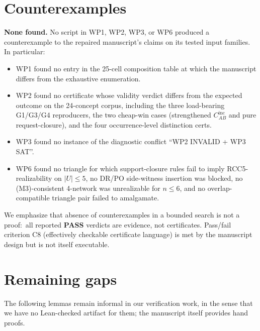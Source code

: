 \documentclass[11pt]{article}
\newcommand{\PASS}{\textcolor{black!70!green}{\textbf{PASS}}}
\begin{document}
\section{Counterexamples}

\textbf{None found.}  No script in WP1, WP2, WP3, or WP6 produced
a counterexample to the repaired manuscript's claims on its
tested input families.  In particular:
\begin{itemize}[leftmargin=2em]
  \item WP1 found no entry in the 25-cell composition table at
    which the manuscript differs from the exhaustive enumeration.
  \item WP2 found no certificate whose validity verdict differs
    from the expected outcome on the 24-concept corpus, including
    the three load-bearing G1/G3/G4 reproducers, the two cheap-win
    cases (strengthened \(C_{AB}^{\mathrm{inc}}\) and pure
    request-closure), and the four occurrence-level distinction
    certs.
  \item WP3 found no instance of the diagnostic conflict ``WP2
    INVALID + WP3 SAT''.
  \item WP6 found no triangle for which support-closure rules
    fail to imply RCC5-realizability on \(|U| \le 5\), no DR/PO
    side-witness insertion was blocked, no (M3)-consistent
    4-network was unrealizable for \(n \le 6\), and no
    overlap-compatible triangle pair failed to amalgamate.
\end{itemize}

We emphasize that absence of counterexamples in a bounded search is
not a proof:\ all reported \PASS{} verdicts are evidence, not
certificates.  Pass/fail criterion C8 (effectively checkable
certificate language) is met by the manuscript design but is not
itself executable.

\section{Remaining gaps}

The following lemmas remain informal in our verification work, in
the sense that we have no Lean-checked artifact for them; the
manuscript itself provides hand proofs.
\end{document}
